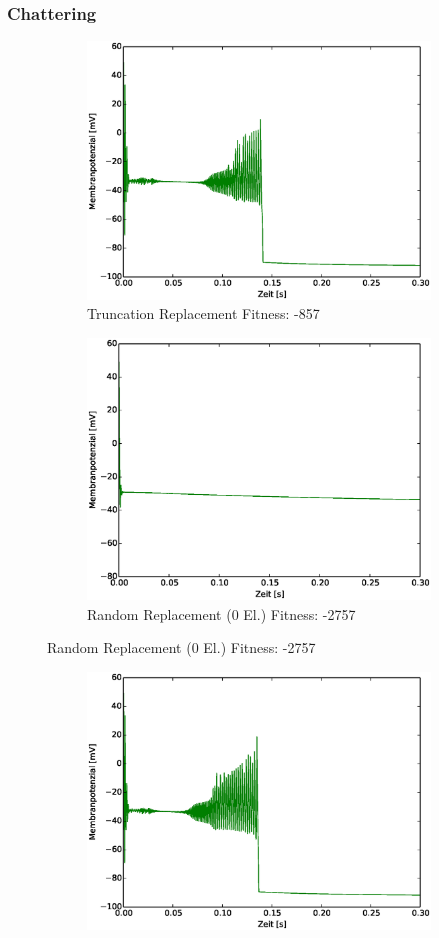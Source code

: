 \begin{frame}
  \frametitle{Chattering}
  \begin{figure}
    \centering
    \begin{subfigure}{.5\textwidth}
      \centering
      \includegraphics*[viewport=19 10 532 394,width=0.7\linewidth]{genetic/ch-base.eps}
      \caption*{\scriptsize{Truncation Replacement} \tiny{Fitness: -857}}
    \end{subfigure}%
    \begin{subfigure}{.5\textwidth}
      \centering
      \includegraphics*[viewport=19 10 532 394,width=0.7\linewidth]{genetic/ch-rand-repl00.eps}
      \caption*{\scriptsize{Random Replacement (0 El.)} \tiny{Fitness: -2757}}
    \end{subfigure}
  \end{figure}
  \begin{figure}
    \centering
    \begin{subfigure}{.5\textwidth}
      \centering
      \includegraphics*[viewport=19 10 532 394,width=0.7\linewidth]{genetic/ch-rand-repl05.eps}

\end{subfigure}
\end{figure}
\end{frame}
